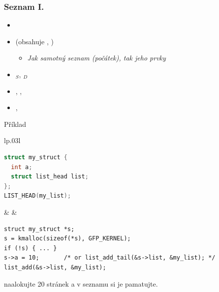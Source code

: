 \begin{frame}[fragile]
  \frametitle{Seznam I.}

  \begin{itemize}
    \item {}
    \item {} (obsahuje , )
    \begin{itemize}
      \item \emph{Jak samotný seznam (počátek), tak jeho prvky}
    \end{itemize}

    \pause

    \item {}$_S$, $_D$

    \pause

    \item {}, ,
    \item {}, 
  \end{itemize}

  \pause

  \begin{block}{Příklad}
  \begin{tabular}{lp{}l}
  \begin{lstlisting}[language=C]
struct my_struct {
  int a;
  struct list_head list;
};
LIST_HEAD(my_list);
  \end{lstlisting} & &
  \begin{lstlisting}
struct my_struct *s;
s = kmalloc(sizeof(*s), GFP_KERNEL);
if (!s) { ... }
s->a = 10;       /* or list_add_tail(&s->list, &my_list); */
list_add(&s->list, &my_list);
  \end{lstlisting}
  \end{tabular}
  \end{block}

  \pause
  \medskip

   naalokujte 20 stránek a v seznamu si je pamatujte.

\end{frame}

